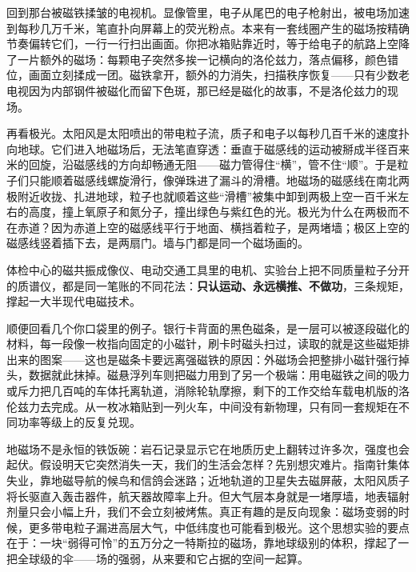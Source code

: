 \begin{mainline}
回到那台被磁铁揉皱的电视机。显像管里，电子从尾巴的电子枪射出，被电场加速到每秒几万千米，笔直扑向屏幕上的荧光粉点。本来有一套线圈产生的磁场按精确节奏偏转它们，一行一行扫出画面。你把冰箱贴靠近时，等于给电子的航路上空降了一片额外的磁场：每颗电子突然多挨一记横向的洛伦兹力，落点偏移，颜色错位，画面立刻揉成一团。磁铁拿开，额外的力消失，扫描秩序恢复——只有少数老电视因为内部钢件被磁化而留下色斑，那已经是磁化的故事，不是洛伦兹力的现场。

再看极光。太阳风是太阳喷出的带电粒子流，质子和电子以每秒几百千米的速度扑向地球。它们进入地磁场后，无法笔直穿透：垂直于磁感线的运动被掰成半径百来米的回旋，沿磁感线的方向却畅通无阻——磁力管得住“横”，管不住“顺”。于是粒子们只能顺着磁感线螺旋滑行，像弹珠进了漏斗的滑槽。地磁场的磁感线在南北两极附近收拢、扎进地球，粒子也就顺着这些“滑槽”被集中卸到两极上空一百千米左右的高度，撞上氧原子和氮分子，撞出绿色与紫红色的光。极光为什么在两极而不在赤道？因为赤道上空的磁感线平行于地面、横挡着粒子，是两堵墙；极区上空的磁感线竖着插下去，是两扇门。墙与门都是同一个磁场画的。

体检中心的磁共振成像仪、电动交通工具里的电机、实验台上把不同质量粒子分开的质谱仪，都是同一笔账的不同花法：\textbf{只认运动、永远横推、不做功}，三条规矩，撑起一大半现代电磁技术。

顺便回看几个你口袋里的例子。银行卡背面的黑色磁条，是一层可以被逐段磁化的材料，每一段像一枚指向固定的小磁针，刷卡时磁头扫过，读取的就是这些磁矩排出来的图案——这也是磁条卡要远离强磁铁的原因：外磁场会把整排小磁针强行掉头，数据就此抹掉。磁悬浮列车则把磁力用到了另一个极端：用电磁铁之间的吸力或斥力把几百吨的车体托离轨道，消除轮轨摩擦，剩下的工作交给车载电机版的洛伦兹力去完成。从一枚冰箱贴到一列火车，中间没有新物理，只有同一套规矩在不同功率等级上的反复兑现。
\end{mainline}


\begin{thought}[如果地磁场关一天]
地磁场不是永恒的铁饭碗：岩石记录显示它在地质历史上翻转过许多次，强度也会起伏。假设明天它突然消失一天，我们的生活会怎样？先别想灾难片。指南针集体失业，靠地磁导航的候鸟和信鸽会迷路；近地轨道的卫星失去磁屏蔽，太阳风质子将长驱直入轰击器件，航天器故障率上升。但大气层本身就是一堵厚墙，地表辐射剂量只会小幅上升，我们不会立刻被烤焦。真正有趣的是反向现象：磁场变弱的时候，更多带电粒子漏进高层大气，中低纬度也可能看到极光。这个思想实验的要点在于：一块“弱得可怜”的五万分之一特斯拉的磁场，靠地球级别的体积，撑起了一把全球级的伞——场的强弱，从来要和它占据的空间一起算。
\end{thought}

